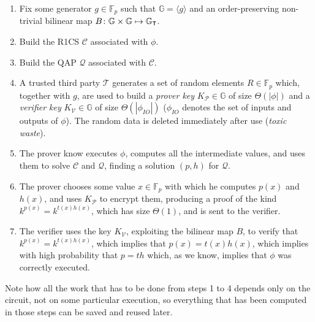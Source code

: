 \begin{enumerate}
	\item Fix some generator \(g \in \mathbb{F}_p\) such that \(\mathbb{G} = \langle{g}\rangle \) and an
	      order-preserving non-trivial bilinear map
	      \(B\colon \mathbb{G} \times \mathbb{G} \mapsto \mathbb{G}_{\transpose}\).
	\item Build the R1CS \(\mathcal{C}\) associated with \(\phi \).
	\item Build the QAP \(\mathcal{Q}\) associated with \(\mathcal{C}\).
	\item A trusted third party \(\mathcal{T}\) generates a set of random elements
	      \(R \in \mathbb{F}_p\) which, together with \(g\), are used to build a \emph{prover key}
	      \(K_{\mathcal{P}} \in \mathbb{G}\) of size \(\Theta(|\phi|)\) and a \emph{verifier key}
	      \(K_{\mathcal{V}} \in \mathbb{G}\) of size \(\Theta(|\phi_{IO}|)\) (\(\phi_{IO}\)
	      denotes the set of inputs and outputs of \(\phi \)).
	      The random data is deleted immediately after use (\emph{toxic waste}).
	\item The prover know executes \(\phi \), computes all the intermediate values, and uses them to
	      solve \(\mathcal{C}\) and \(\mathcal{Q}\), finding a solution \((p, h)\) for \(\mathcal{Q}\).
	\item The prover chooses some value \(x \in \mathbb{F}_p\) with which he computes \(p(x)\) and
	      \(h(x)\), and uses \(K_{\mathcal{P}}\) to encrypt them, producing a proof of the kind
	      \(k^{p(x)} = k^{t(x)h(x)}\), which has size \(\Theta(1)\), and is sent to the
	      verifier.
	\item The verifier uses the key \(K_{\mathcal{V}}\), exploiting the bilinear map \(B\), to
	      verify that \(k^{p(x)} = k^{t(x)h(x)}\), which implies that \(p(x) = t(x)h(x)\), which
	      implies with high probability that \(p = th\) which, as we know, implies that
	      \(\phi \) was correctly executed.
\end{enumerate}

\noindent Note how all the work that has to be done from steps 1 to 4 depends only on the
circuit, not on some particular execution, so everything that has been computed in those steps 
can be saved and reused later.
